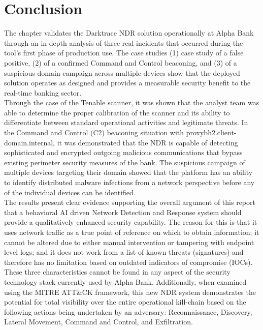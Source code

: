 \documentclass[12pt,a4paper]{report}
\begin{document}
\section{Conclusion}
The chapter validates the Darktrace NDR solution operationally at Alpha Bank through an in-depth analysis of three real incidents that occurred during the tool's first phase of production use. The case studies (1) case study of a false positive, (2) of a confirmed Command and Control beaconing, and (3) of a suspicious domain campaign across multiple devices show that the deployed solution operates as designed and provides a measurable security benefit to the real-time banking sector.\\

Through the case of the Tenable scanner, it was shown that the analyst team was able to determine the proper calibration of the scanner and its ability to differentiate between standard operational activities and legitimate threats. In the Command and Control (C2) beaconing situation with proxybh2.client-domain.internal, it was demonstrated that the NDR is capable of detecting sophisticated and encrypted outgoing malicious communications that bypass existing perimeter security measures of the bank. The suspicious campaign of multiple devices targeting their domain showed that the platform has an ability to identify distributed malware infections from a network perspective before any of the individual devices can be identified.\\

The results present clear evidence supporting the overall argument of this report that a behavioral AI driven Network Detection and Response system should provide a qualitatively enhanced security capability. The reason for this is that it uses network traffic as a true point of reference on which to obtain information; it cannot be altered due to either manual intervention or tampering with endpoint level logs; and it does not work from a list of known threats (signatures) and therefore has no limitation based on outdated indicators of compromise (IOCs). These three characteristics cannot be found in any aspect of the security technology stack currently used by Alpha Bank. Additionally, when examined using the MITRE ATT\&CK framework, this new NDR system demonstrates the potential for total visibility over the entire operational kill-chain based on the following actions being undertaken by an adversary: Reconnaissance, Discovery, Lateral Movement, Command and Control, and Exfiltration.\\
\end{document}
